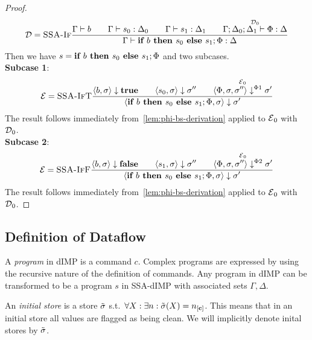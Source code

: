 \begin{proof}
\begin{align*}
        \operatorname{\mathcal{D}} = \textsc{SSA-If}\frac{\displaystyle \Gamma \vdash {b}\qquad
        \Gamma \vdash {s_0}: \Delta_0\qquad \Gamma \vdash {s_1}: \Delta_1\qquad
        \overset{\operatorname{\mathcal{D}}_0}{\Gamma;\Delta_0;\Delta_1 \vdash {\Phi}: \Delta}}{\displaystyle \Gamma \vdash {\textbf{if }{b} \textbf{ then }{s_0}\textbf{ else }{s_1};{\Phi}}: \Delta}
    \end{align*}
    Then we have $s = \textbf{if }{b} \textbf{ then }{s_0}\textbf{ else }{s_1};{\Phi}$ and
    two subcases.\\
    \textbf{Subcase 1}:
    \begin{align*}
        \operatorname{\mathcal{E}} = \textsc{SSA-IfT}\frac{\displaystyle \langle b, \sigma \rangle \downarrow \textbf{true}\qquad \langle s_0, \sigma \rangle \downarrow \sigma''
        \qquad \overset{\operatorname{\mathcal{E}}_0}{\langle \Phi, \sigma, \sigma'' \rangle \downarrow^{\Phi1} \sigma'}}{\displaystyle \langle \textbf{if }{b} \textbf{ then }{s_0}\textbf{ else }{s_1};{\Phi}, \sigma \rangle \downarrow \sigma'}
    \end{align*}
    The result follows immediately from~\autoref{lem:phi-bs-derivation} applied to $\operatorname{\mathcal{E}}_0$ with $\operatorname{\mathcal{D}}_0$.\\
    \textbf{Subcase 2}:
    \begin{align*}
        \operatorname{\mathcal{E}} = \textsc{SSA-IfF}\frac{\displaystyle \langle b, \sigma \rangle \downarrow \textbf{false}\qquad \langle s_1, \sigma \rangle \downarrow \sigma''
        \qquad \overset{\operatorname{\mathcal{E}}_0}{\langle \Phi, \sigma, \sigma'' \rangle \downarrow^{\Phi2} \sigma'}}{\displaystyle \langle \textbf{if }{b} \textbf{ then }{s_0}\textbf{ else }{s_1};{\Phi}, \sigma \rangle \downarrow \sigma'}
    \end{align*}
    The result follows immediately from~\autoref{lem:phi-bs-derivation} applied to $\operatorname{\mathcal{E}}_0$ with $\operatorname{\mathcal{D}}_0$.
\end{proof}

\subsection{Definition of Dataflow}
\begin{definition}[Program]
    A \emph{program} in dIMP is a command $c$.
    Complex programs are expressed by using the recursive nature of
    the definition of commands.
    Any program in dIMP can be transformed to be a program $s$ in SSA-dIMP with associated
    sets $\Gamma, \Delta$.
\end{definition}

\begin{definition}
    An \emph{initial store} is a store $\tilde{\sigma}$ s.t.\ 
    $\forall X: \exists n: \initialstore(X) = \clean[n]$.
    This means that in an initial store all values are flagged as being clean.
    We will implicitly denote inital stores by $\tilde{\sigma}$.
\end{definition}

